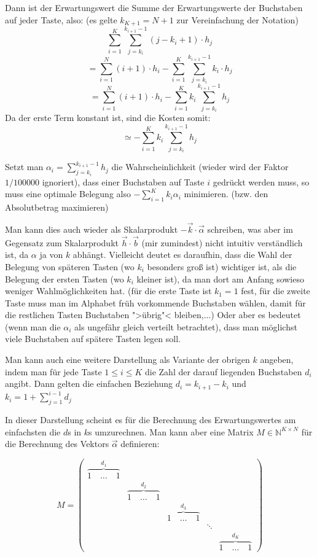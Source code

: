 \documentclass[11pt,a4paper]{article}
\begin{document}
Dann ist der Erwartungswert die Summe der Erwartungswerte der Buchstaben auf jeder Taste, also: (es gelte $k_{K+1}=N+1$ zur Vereinfachung der Notation)
\[\sum\limits_{i=1}^{K}\sum\limits_{j=k_i}^{k_{i+1}-1}(j-k_i+1)\cdot h_j\]
\[=\sum\limits_{i=1}^{N}(i+1)\cdot h_i - \sum\limits_{i=1}^{K}\sum\limits_{j=k_i}^{k_{i+1}-1}k_i\cdot h_j\]
\[=\sum\limits_{i=1}^{N}(i+1)\cdot h_i - \sum\limits_{i=1}^{K}k_i\sum\limits_{j=k_i}^{k_{i+1}-1} h_j\]
Da der erste Term konstant ist, sind die Kosten somit:
\[\simeq- \sum\limits_{i=1}^{K}k_i\sum\limits_{j=k_i}^{k_{i+1}-1} h_j\]

Setzt man $\alpha_i = \sum\limits_{j=k_i}^{k_{i+1}-1} h_j$ die Wahrscheinlichkeit (wieder wird der Faktor $1/100000$ ignoriert), dass einer Buchstaben auf Taste $i$ gedrückt werden muss, so muss eine optimale Belegung also $- \sum\limits_{i=1}^{K}k_i\alpha_i$ minimieren. (bzw. den Absolutbetrag maximieren)

Man kann dies auch wieder als Skalarprodukt $-\vec{k}\cdot\vec{\alpha}$ schreiben, was aber im Gegensatz zum Skalarprodukt $\vec{h}\cdot\vec{b}$ (mir zumindest) nicht intuitiv verständlich ist, da $\alpha$ ja von $k$ abhängt. Vielleicht deutet es daraufhin, dass die Wahl der Belegung von späteren Tasten (wo $k_i$ besonders groß ist) wichtiger ist, als die Belegung der ersten Tasten (wo $k_i$ kleiner ist), da man dort  am Anfang sowieso weniger Wahlmöglichkeiten hat. (für die erste Taste ist $k_1=1$ fest, für die zweite Taste muss man im Alphabet früh vorkommende Buchstaben wählen, damit für die restlichen Tasten Buchstaben ">übrig"< bleiben,...)
Oder aber es bedeutet (wenn man die $\alpha_i$ als ungefähr gleich verteilt betrachtet), dass man möglichst viele Buchstaben auf spätere Tasten legen soll.

Man kann auch eine weitere Darstellung als Variante der obrigen $k$ angeben, indem man für jede Taste $1 \leq i \leq K$ die Zahl der darauf liegenden Buchstaben $d_i$ angibt. Dann gelten die einfachen Beziehung $d_i = k_{i+1} - k_{i}$ und $k_i = 1+\sum\limits_{j=1}^{i-1}d_j$

In dieser Darstellung scheint es für die Berechnung des Erwartungswertes am einfachsten die $d$s in $k$s umzurechnen. Man kann aber eine Matrix $M\in \mathbb{N}^{K\times N}$ für die Berechnung des Vektors $\vec{\alpha}$ definieren:

\[
M = \left(\begin{matrix}
\overbrace{1\quad\ldots\quad 1}^{d_1}& \\
&\overbrace{1\quad\ldots\quad 1}^{d_2}& \\
&&\overbrace{1\quad\ldots\quad 1}^{d_3}& \\
&&&\ddots&\\
&&&&\overbrace{1\quad\ldots\quad 1}^{d_K}
\end{matrix}\right)\]
\end{document}
